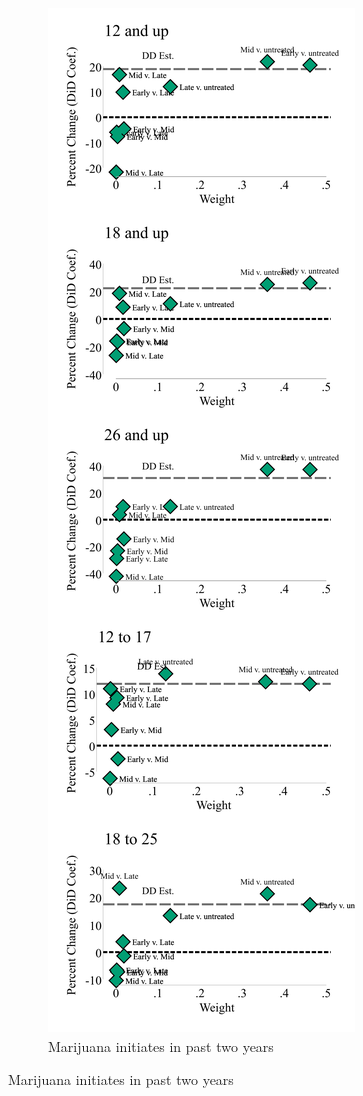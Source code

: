 \documentclass[12pt]{article}%
\begin{document}
\begin{appendices}
\begin{figure}
\begin{minipage}{.9\linewidth}
\begin{subfigure}[b]{0.32\columnwidth}
  \end{subfigure}
 \hfill %
  \begin{subfigure}[b]{0.32\columnwidth}
      \caption{\scriptsize{Marijuana initiates in past two years}}
    \includegraphics[width=\linewidth]{../output/plots/bacon_weights_ln_mj_first_use.pdf}

\end{subfigure}
\end{minipage}
\end{figure}
\end{appendices}
\end{document}
